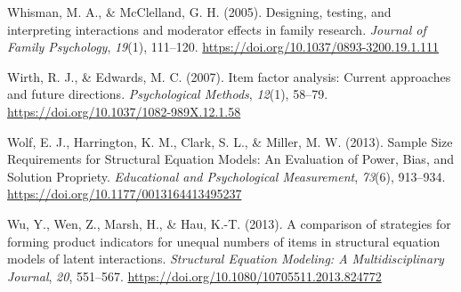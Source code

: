 \documentclass[
  11pt,
  man]{apa6}
\newlength{\cslhangindent}
\newlength{\cslentryspacingunit} %
\newenvironment{CSLReferences}[2] %
 {%
  \setlength{\parindent}{0pt}
  \ifodd #1
  \let\oldpar\par
  \def\par{\hangindent=\cslhangindent\oldpar}
  \fi
  \setlength{\parskip}{#2\cslentryspacingunit}
 }%
 {}
\begin{document}
\begin{CSLReferences}{1}{0}
\leavevmode{}%
Whisman, M. A., \& McClelland, G. H. (2005). Designing, {testing}, and {interpreting interactions} and {moderator effects} in {family research}. \emph{Journal of Family Psychology}, \emph{19}(1), 111--120. \url{https://doi.org/10.1037/0893-3200.19.1.111}

\leavevmode{}%
Wirth, R. J., \& Edwards, M. C. (2007). Item factor analysis: {Current} approaches and future directions. \emph{Psychological Methods}, \emph{12}(1), 58--79. \url{https://doi.org/10.1037/1082-989X.12.1.58}

\leavevmode{}%
Wolf, E. J., Harrington, K. M., Clark, S. L., \& Miller, M. W. (2013). Sample {Size Requirements} for {Structural Equation Models}: {An Evaluation} of {Power}, {Bias}, and {Solution Propriety}. \emph{Educational and Psychological Measurement}, \emph{73}(6), 913--934. \url{https://doi.org/10.1177/0013164413495237}

\leavevmode{}%
Wu, Y., Wen, Z., Marsh, H., \& Hau, K.-T. (2013). A comparison of strategies for forming product indicators for unequal numbers of items in structural equation models of latent interactions. \emph{Structural Equation Modeling: A Multidisciplinary Journal}, \emph{20}, 551--567. \url{https://doi.org/10.1080/10705511.2013.824772}

\end{CSLReferences}
\end{document}
